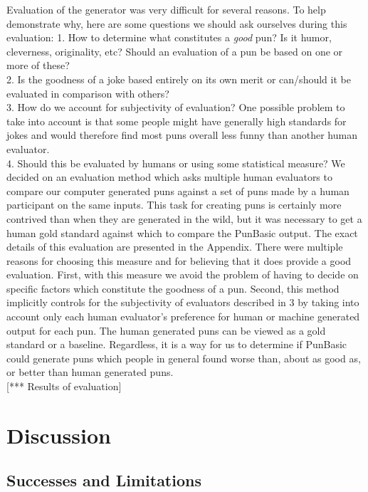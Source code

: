\documentclass[11pt,letterpaper]{article}
\begin{document}
Evaluation of the generator was very difficult for several reasons. To help demonstrate why, here are some questions we should ask ourselves during this evaluation: 
1. How to determine what constitutes a \textit{good} pun? Is it humor, cleverness, originality, etc? Should an evaluation of a pun be based on one or more of these?\\
2. Is the goodness of a joke based entirely on its own merit or can/should it be evaluated in comparison with others?\\
3. How do we account for subjectivity of evaluation? One possible problem to take into account is that some people might have generally high standards for jokes and would therefore find most puns overall less funny than another human evaluator.\\
4. Should this be evaluated by humans or using some statistical measure?
We decided on an evaluation method which asks multiple human evaluators to compare our computer generated puns against a set of puns made by a human participant on the same inputs. This task for creating puns is certainly more contrived than when they are generated in the wild, but it was necessary to get a human gold standard against which to compare the PunBasic output. The exact details of this evaluation are presented in the Appendix.
There were multiple reasons for choosing this measure and for believing that it does provide a good evaluation. First, with this measure we avoid the problem of having to decide on specific factors which constitute the goodness of a pun. Second, this method implicitly controls for the subjectivity of evaluators described in 3 by taking into account only each human evaluator's preference for human or machine generated output for each pun. The human generated puns can be viewed as a gold standard or a baseline. Regardless, it is a way for us to determine if PunBasic could generate puns which people in general found worse than, about as good as, or better than human generated puns.\\

[*** Results of evaluation]

\section{Discussion}

\subsection{Successes and Limitations}
\end{document}
